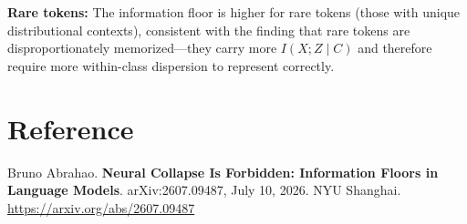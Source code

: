 \documentclass[10pt,twocolumn]{article}
\begin{document}
\textbf{Rare tokens:} The information floor is higher for rare tokens
(those with unique distributional contexts), consistent with the
finding that rare tokens are disproportionately memorized---they
carry more $I(X; Z \mid C)$ and therefore require more within-class
dispersion to represent correctly.

\section*{Reference}

Bruno Abrahao.
\textbf{Neural Collapse Is Forbidden: Information Floors in
Language Models}.
arXiv:2607.09487, July 10, 2026. NYU Shanghai.
\url{https://arxiv.org/abs/2607.09487}
\end{document}

